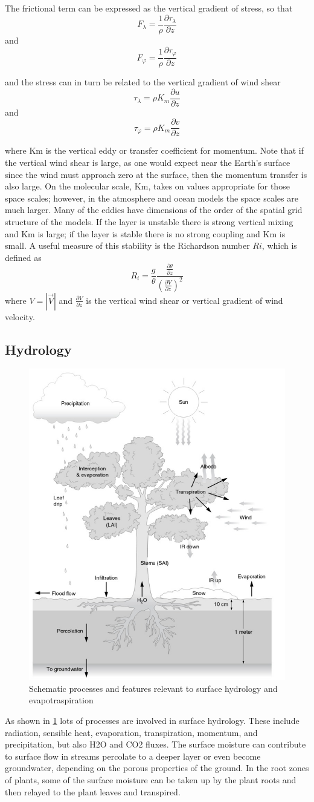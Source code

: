 The frictional term can be expressed as the vertical gradient of stress, so that $$F_\lambda = \frac{1}{\rho} \frac{\partial \tau_\lambda}{\partial z}$$ 
and $$F_\varphi = \frac{1}{\rho} \frac{\partial \tau_\varphi}{\partial z}$$


and the stress can in turn be related to the vertical gradient of wind shear 
$$\tau_\lambda = \rho K_m \frac{\partial u}{\partial z}$$
and $$\tau_\varphi = \rho K_m \frac{\partial v}{\partial z}$$

where Km is the vertical eddy or transfer coefficient for momentum. Note that if the vertical wind shear is large, as one would expect near the Earth's surface since the wind must approach zero at the surface, then the momentum transfer is also large. On the molecular scale, Km, takes on values appropriate for those space scales; however, in the atmosphere and ocean models the space scales are much larger. Many of the eddies have dimensions of the order of the spatial grid structure of the models. 
If the layer is unstable there is strong vertical mixing and Km is large; if the layer is stable there is no strong coupling and Km is small. A useful measure of this stability is the Richardson number $Ri$, which is defined as 
$$R_i = \frac{g}{\theta} \frac{\frac{\partial \theta}{\partial z}}{\left( \frac{\partial V}{\partial z} \right)^2}$$
where $V = \left| \vec{V} \right|$ and $\frac{\partial V}{\partial z}$ is the vertical wind shear or vertical gradient of wind velocity. 

\subsection{Hydrology}
\begin{figure}[htp!]
    \centering
    \includegraphics[width=0.5\linewidth]{uploads/15image.png}
    \caption{Schematic processes and features relevant to surface hydrology and evapotraspiration}
    \label{fig: fig 2}
\end{figure}
As shown in \ref{fig: fig 2} lots of processes are involved in surface hydrology. These include radiation, sensible heat, evaporation, transpiration, momentum, and precipitation, but also H2O and CO2 fluxes. The surface moisture can contribute to surface flow in streams percolate to a deeper layer or even become groundwater, depending on the porous properties of the ground. In the root zones of plants, some of the surface moisture can be taken up by the plant roots and then relayed to the plant leaves and transpired. 

